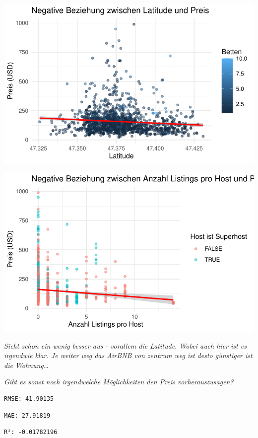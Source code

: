 \documentclass[
  journal,
]{IEEEtran}%
\begin{document}
\includegraphics{main_files/figure-pdf/unnamed-chunk-9-2.pdf}

\includegraphics{main_files/figure-pdf/unnamed-chunk-9-3.pdf}

\emph{Sieht schon ein wenig besser aus - vorallem die Latitude. Wobei
auch hier ist es irgendwie klar. Je weiter weg das AirBNB von zentrum
weg ist desto günstiger ist die Wohnung\ldots{}}

\emph{Gibt es sonst noch irgendwelche Möglichkeiten den Preis
vorherauszusagen?}

\begin{verbatim}
RMSE: 41.90135 
\end{verbatim}

\begin{verbatim}
MAE: 27.91819 
\end{verbatim}

\begin{verbatim}
R²: -0.01782196 
\end{verbatim}
\end{document}

